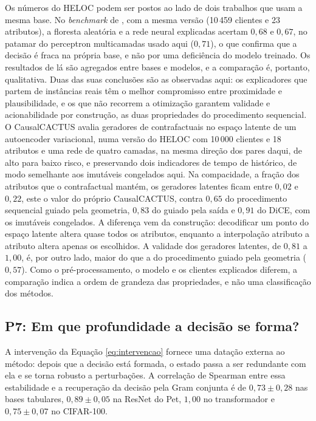 Os números do HELOC podem ser postos ao lado de dois trabalhos que usam a mesma base. No \textit{benchmark} de \citet{Guidotti2022}, com a mesma versão (10\,459 clientes e 23 atributos), a floresta aleatória e a rede neural explicadas acertam $0{,}68$ e $0{,}67$, no patamar do perceptron multicamadas usado aqui ($0{,}71$), o que confirma que a decisão é fraca na própria base, e não por uma deficiência do modelo treinado. Os resultados de lá são agregados entre bases e modelos, e a comparação é, portanto, qualitativa. Duas das suas conclusões são as observadas aqui: os explicadores que partem de instâncias reais têm o melhor compromisso entre proximidade e plausibilidade, e os que não recorrem a otimização garantem validade e acionabilidade por construção, as duas propriedades do procedimento sequencial. O CausalCACTUS \citep{Wang2026} avalia geradores de contrafactuais no espaço latente de um autoencoder variacional, numa versão do HELOC com 10\,000 clientes e 18 atributos e uma rede de quatro camadas, na mesma direção dos pares daqui, de alto para baixo risco, e preservando dois indicadores de tempo de histórico, de modo semelhante aos imutáveis congelados aqui. Na compacidade, a fração dos atributos que o contrafactual mantém, os geradores latentes ficam entre $0{,}02$ e $0{,}22$, este o valor do próprio CausalCACTUS, contra $0{,}65$ do procedimento sequencial guiado pela geometria, $0{,}83$ do guiado pela saída e $0{,}91$ do DiCE, com os imutáveis congelados. A diferença vem da construção: decodificar um ponto do espaço latente altera quase todos os atributos, enquanto a interpolação atributo a atributo altera apenas os escolhidos. A validade dos geradores latentes, de $0{,}81$ a $1{,}00$, é, por outro lado, maior do que a do procedimento guiado pela geometria ($0{,}57$). Como o pré-processamento, o modelo e os clientes explicados diferem, a comparação indica a ordem de grandeza das propriedades, e não uma classificação dos métodos.

\subsection{P7: Em que profundidade a decisão se forma?}\label{subsec:res_datacao}

A intervenção da Equação \eqref{eq:intervencao} fornece uma datação externa ao método: depois que a decisão está formada, o estado passa a ser redundante com ela e se torna robusto a perturbações. A correlação de Spearman entre essa estabilidade e a recuperação da decisão pela Gram conjunta é de $0{,}73 \pm 0{,}28$ nas bases tabulares, $0{,}89 \pm 0{,}05$ na ResNet do Pet, $1{,}00$ no transformador e $0{,}75 \pm 0{,}07$ no CIFAR-100.


